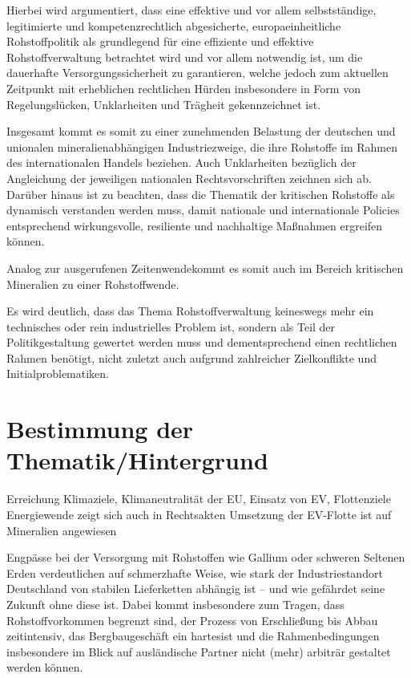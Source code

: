 \documentclass[12pt,a4paper,oneside]{book} %
\begin{document}
	Hierbei wird argumentiert, dass eine effektive und vor allem selbstständige, legitimierte und kompetenzrechtlich abgesicherte, europaeinheitliche Rohstoffpolitik als grundlegend für eine effiziente und effektive Rohstoffverwaltung betrachtet wird und vor allem notwendig ist, um die dauerhafte Versorgungssicherheit zu garantieren, welche jedoch zum aktuellen Zeitpunkt mit erheblichen rechtlichen Hürden insbesondere in Form von Regelungslücken, Unklarheiten und Trägheit gekennzeichnet ist.
	
	Insgesamt kommt es somit zu einer zunehmenden Belastung der deutschen und unionalen mineralienabhängigen Industriezweige, die ihre Rohstoffe im Rahmen des internationalen Handels beziehen. Auch Unklarheiten bezüglich der Angleichung der jeweiligen nationalen Rechtsvorschriften zeichnen sich ab. Darüber hinaus ist zu beachten, dass die Thematik der kritischen Rohstoffe als dynamisch verstanden werden muss, damit nationale und internationale Policies entsprechend wirkungsvolle, resiliente und nachhaltige Maßnahmen ergreifen können.
	
	Analog zur ausgerufenen \glqq Zeitenwende\grqq kommt es somit auch im Bereich kritischen Mineralien zu einer \glqq Rohstoffwende\grqq.
	
	Es wird deutlich, dass das Thema Rohstoffverwaltung keineswegs mehr ein technisches oder rein industrielles Problem ist, sondern als Teil der Politikgestaltung gewertet werden muss und dementsprechend einen rechtlichen Rahmen benötigt, nicht zuletzt auch aufgrund zahlreicher Zielkonflikte und Initialproblematiken.
	
	
	\section{Bestimmung der Thematik/Hintergrund}
	Erreichung Klimaziele, Klimaneutralität der EU, Einsatz von EV, Flottenziele
	Energiewende zeigt sich auch in Rechtsakten
	Umsetzung der EV-Flotte ist auf Mineralien angewiesen

	
	Engpässe bei der Versorgung mit Rohstoffen wie Gallium oder schweren Seltenen Erden verdeutlichen auf schmerzhafte Weise, wie stark der Industriestandort Deutschland von stabilen Lieferketten abhängig ist – und wie gefährdet seine Zukunft ohne diese ist. Dabei kommt insbesondere zum Tragen, dass Rohstoffvorkommen begrenzt sind, der Prozess von Erschließung bis Abbau zeitintensiv, das Bergbaugeschäft ein \glqq hartes\grqq ist und die Rahmenbedingungen insbesondere im Blick auf ausländische Partner nicht (mehr) arbiträr gestaltet werden können.
	
\end{document}
